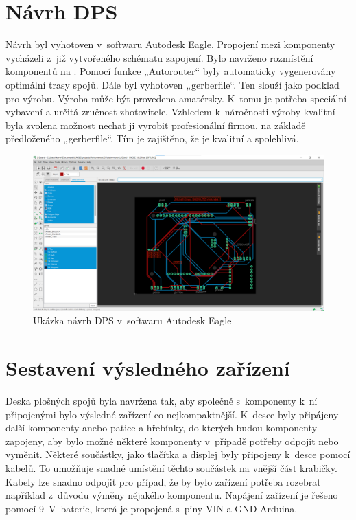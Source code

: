\section{Návrh DPS}
Návrh  byl vyhotoven v~softwaru Autodesk Eagle. Propojení mezi komponenty vycházeli z~již vytvořeného schématu zapojení. Bylo navrženo rozmístění komponentů na . Pomocí funkce „Autorouter“ byly automaticky vygenerovány optimální trasy spojů. Dále byl vyhotoven „gerberfile“. Ten slouží jako podklad pro výrobu. Výroba  může být provedena amatérsky. K~tomu je potřeba speciální vybavení a určitá zručnost zhotovitele. Vzhledem k~náročnosti výroby kvalitní  byla zvolena možnost nechat ji vyrobit profesionální firmou, na základě předloženého „gerberfile“. Tím je zajištěno, že je  kvalitní a spolehlivá.

\begin{figure}[H]
	\centering
	\includegraphics[width=15cm]{images/komponenty/EAGLE_NAVRH_DPS.png}
	\caption{Ukázka návrh DPS v~softwaru Autodesk Eagle}
\end{figure}

\section{Sestavení výsledného zařízení}
Deska plošných spojů byla navržena tak, aby společně s~komponenty k~ní připojenými bylo výsledné zařízení co nejkompaktnější. K~desce byly připájeny další komponenty anebo patice a hřebínky, do kterých budou komponenty zapojeny, aby bylo možné některé komponenty v~případě potřeby odpojit nebo vyměnit. Některé součástky, jako tlačítka a displej byly připojeny k~desce pomocí kabelů. To umožňuje snadné umístění těchto součástek na vnější část krabičky. Kabely lze snadno odpojit pro případ, že by bylo zařízení potřeba rozebrat například z~důvodu výměny nějakého komponentu. Napájení zařízení je řešeno pomocí 9~V~baterie, která je propojená s~piny VIN a GND Arduina.

